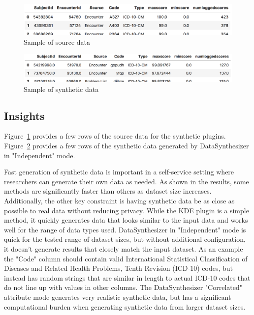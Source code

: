 \documentclass{amia}
\begin{document}
\begin{figure}[ht]
  \centering
  \includegraphics[width=120mm]{sample_source_data}
  \caption{Sample of source data}
  \label{fig:sample_source_data}
\end{figure}
\begin{figure}[ht]
  \centering
  \includegraphics[width=120mm]{sample_synthetic_data}
  \caption{Sample of synthetic data}
  \label{fig:sample_synthetic_data}
\end{figure}

\subsection{Insights}

Figure~\ref{fig:sample_source_data} provides a few rows of the source data for the synthetic plugins. Figure~\ref{fig:sample_synthetic_data} provides a few rows of the synthetic data generated by DataSynthesizer in "Independent" mode.

Fast generation of synthetic data is important in a self-service setting where researchers can generate their own data as needed. As shown in the results, some methods are significantly faster than others as dataset size increases. Additionally, the other key constraint is having synthetic data be as close as possible to real data without reducing privacy.  While the KDE plugin is a simple method, it quickly generates data that looks similar to the input data and works well for the range of data types used. DataSynthesizer in "Independent" mode is quick for the tested range of dataset sizes, but without additional configuration, it doesn't generate results that closely match the input dataset. As an example the "Code" column should contain valid International Statistical Classification of Diseases and Related Health Problems, Tenth Revision (ICD-10) codes, but instead has random strings that are similar in length to actual ICD-10 codes that do not line up with values in other columns. The DataSynthesizer "Correlated" attribute mode generates very realistic synthetic data, but has a significant computational burden when generating synthetic data from larger dataset sizes.
\end{document}

